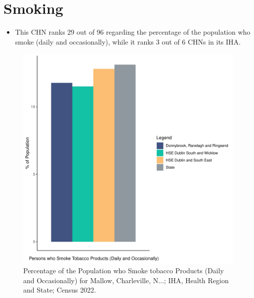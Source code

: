 \documentclass{article}
\begin{document}
\pagebreak

\section{Smoking}\label{sect:Smoking}
\begin{itemize}
\item This CHN ranks  29 out of 96 regarding the percentage of the population who smoke (daily and occasionally), while it ranks   3 out of 6 CHNs in its IHA.
\end{itemize}
\begin{figure}[H]
	\centering
	\includegraphics[width = 120mm]{../figures/SmokingED.pdf}
	\caption{Percentage of the Population who Smoke tobacco Products (Daily and Occasionally) for Mallow, Charleville, N...; IHA, Health Region and State; Census 2022.}
	\label{fig:2ae19629-1a6a-13a3-e055-000000000001}
	\end{figure}
	
\end{document}
